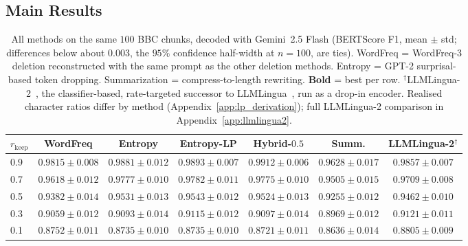 \documentclass[11pt]{article}
\newcommand{\rkeep}{r_{\mathrm{keep}}}
\begin{document}
\subsection{Main Results}
\label{sec:main_results}

\begin{table}[t]
\centering
\small
\setlength{\tabcolsep}{4.5pt}
\caption{All methods on the same $100$ BBC chunks, decoded with Gemini~2.5 Flash
(BERTScore F1, mean $\pm$ std; differences below about $0.003$, the $95\%$ confidence half-width at $n{=}100$, are ties).
WordFreq = WordFreq-3 deletion reconstructed with the same prompt as the other deletion methods. Entropy = GPT-2
surprisal-based token dropping. Summarization = compress-to-length rewriting.
\textbf{Bold} = best per row. $^{\dagger}$LLMLingua-2~\citep{pan2024llmlingua}, the classifier-based,
rate-targeted successor to LLMLingua~\citep{jiang2023llmlingua}, run as a drop-in encoder. Realised character
ratios differ by method (Appendix~\ref{app:lp_derivation}); full LLMLingua-2 comparison in Appendix~\ref{app:llmlingua2}.}
\label{tab:semantic_baselines}
\begin{tabular}{lcccccc}
\toprule
$\rkeep$ & WordFreq & Entropy & Entropy-LP & Hybrid-$0.5$ & Summ. & LLMLingua-2$^{\dagger}$ \\
\midrule
0.9 & $0.9815 \pm 0.008$ & $0.9881 \pm 0.012$ & $0.9893 \pm 0.007$ & $\mathbf{0.9912} \pm 0.006$ & $0.9628 \pm 0.017$ & $0.9857 \pm 0.007$ \\
0.7 & $0.9618 \pm 0.012$ & $0.9777 \pm 0.010$ & $\mathbf{0.9782} \pm 0.011$ & $0.9775 \pm 0.010$ & $0.9505 \pm 0.015$ & $0.9709 \pm 0.008$ \\
0.5 & $0.9382 \pm 0.014$ & $0.9531 \pm 0.013$ & $\mathbf{0.9543} \pm 0.012$ & $0.9524 \pm 0.013$ & $0.9255 \pm 0.012$ & $0.9462 \pm 0.010$ \\
0.3 & $0.9059 \pm 0.012$ & $0.9093 \pm 0.014$ & $0.9115 \pm 0.012$ & $0.9097 \pm 0.014$ & $0.8969 \pm 0.012$ & $\mathbf{0.9121} \pm 0.011$ \\
0.1 & $0.8752 \pm 0.011$ & $0.8735 \pm 0.010$ & $0.8735 \pm 0.010$ & $0.8721 \pm 0.011$ & $0.8636 \pm 0.014$ & $\mathbf{0.8805} \pm 0.009$ \\
\bottomrule
\end{tabular}
\end{table}
\end{document}
